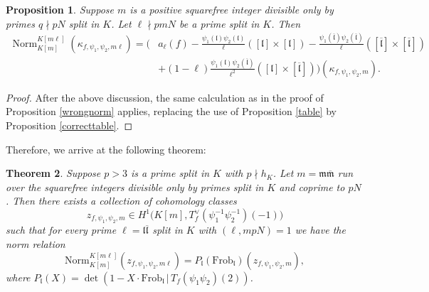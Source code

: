 \documentclass[10pt,letterpaper]{amsart}
\theoremstyle{plain}
\newtheorem{thm}{Theorem}[subsection] %
\theoremstyle{definition}
\theoremstyle{definition}
\theoremstyle{plain}
\newtheorem{prop}[thm]{Proposition}
\theoremstyle{plain}
\theoremstyle{plain}
\theoremstyle{remark}
\numberwithin{equation}{section}
\newcommand{\fkm}{\mathfrak{m}}
\newcommand{\fkmbar}{\overline{\mathfrak{m}}}
\newcommand{\fkl}{\mathfrak{l}}
\newcommand{\fklbar}{\overline{\mathfrak{l}}}
\DeclareMathOperator{\Norm}{\mathrm{Norm}}
\begin{document}
\begin{prop}\label{correctnorm}
Suppose $m$ is a positive squarefree integer divisible only by primes $q\nmid pN$ split in $K$. Let $\ell\nmid pmN$ be a prime split in $K$. Then
\begin{align*}
\Norm_{K[m]}^{K[m\ell]}({\kappa}_{f,\psi_1,\psi_2,m\ell})=\bigg(&a_\ell(f)-\frac{\psi_1(\fkl)\psi_2(\fkl)}{\ell}([\fkl]\times [\fkl])-\frac{\psi_1(\fklbar)\psi_2(\fklbar)}{\ell}([\fklbar]\times [\fklbar])\\
   &+(1-\ell)\frac{\psi_1(\fkl)\psi_2(\fklbar)}{\ell^2}([\fkl]\times[\fklbar])\bigg)
    ({\kappa}_{f,\psi_1,\psi_2,m}).
\end{align*}
\end{prop}

\begin{proof}
After the above discussion, the same calculation as in the proof of Proposition \ref{wrongnorm} applies, replacing the use of Proposition \ref{table} by Proposition \ref{correcttable}.
\end{proof}

Therefore, we arrive at the following theorem:


\begin{thm}\label{maintheorem1}
Suppose $p>3$ is a prime split in $K$ with $p\nmid h_K$. Let $m=\fkm\fkmbar$ run over the squarefree integers divisible only by primes split in $K$ and coprime to $pN$. 
Then there exists a collection of cohomology classes
\[
z_{f,\psi_1,\psi_2,m}\in H^1\bigl(K[m],T_f^{\vee}(\psi_{1}^{-1}\psi_{2}^{-1})(-1)\bigr)
\]
such that for every prime $\ell=\fkl\fklbar$ split in $K$ with $(\ell,mpN)=1$ we have the norm relation
\begin{equation*}
    \mathrm{Norm}_{K[m]}^{K[m\ell]}(z_{f,\psi_1,\psi_2,m\ell})=P_{\fkl}(\mathrm{Frob}_{\fkl})(z_{f,\psi_1,\psi_2,m}),
\end{equation*}
where $P_{\fkl}(X)=\det(1-X\cdot \mathrm{Frob}_{\fkl}\,|\,T_f(\psi_1\psi_2)(2))$.
\end{thm}
\end{document}
